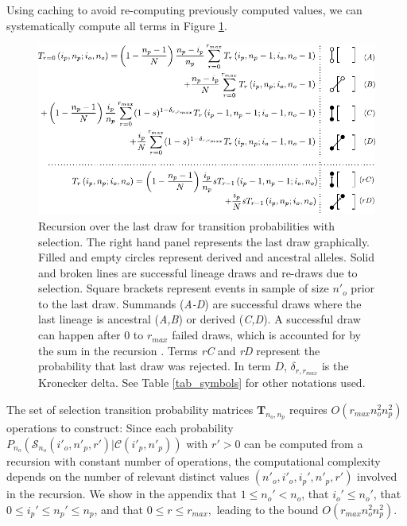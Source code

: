 \documentclass[9pt,twocolumn,twoside,lineno]{gsajnl}
\begin{document}
Using caching to avoid re-computing previously computed values, we can systematically compute all terms in Figure
\ref{fig_rec_selection_dynamic_fail}.
\begin{figure}
  \centering
  \includegraphics[width=\columnwidth]{fig/recurrence-selection-dynamic-failures-annotated_horizontal.pdf}

  \caption{Recursion over the last draw for transition probabilities with selection. 
    The right hand panel represents the last draw graphically.
    Filled and empty circles represent derived and ancestral alleles. 
    Solid and broken lines are
    successful lineage draws and re-draws due to selection.
    Square brackets represent events in sample of size $n'_o$ prior to the last draw. Summands
    (\textit{A-D}) are successful draws where the last lineage is ancestral (\textit{A,B}) or
    derived (\textit{C,D}). A successful draw can happen after
    $0$ to $r_{max}$ failed draws, which is accounted for by the sum in the recursion . Terms \textit{rC} and \textit{rD}
    represent the probability that last draw was rejected. In term $D$, $\delta_{r,r_{max}}$ is the Kronecker delta. See Table \ref{tab_symbols} for other notations used.
  }

  \label{fig_rec_selection_dynamic_fail}
\end{figure}
The set of selection transition probability matrices $\mathbf{T}_{n_o,n_p}$ requires $O(r_{max}n_o^2 n_p^2)$
operations to construct: Since each probability $P_{n_o}(\mathcal{S}_{n_o}(i'_o, n'_p, r')| \mathcal{C}(i'_p,n'_p) )$ with $r'>0$ can be computed from a recursion with
constant number of operations, the computational complexity depends on the number of relevant distinct values $(n'_o, i'_o,i_p', n'_p, r')$ involved in the recursion.   
We show in the appendix that $1 \leq n_o'<n_o$, that $i_o' \leq n_o'$, that $0\leq
i_p' \leq n_p' \leq n_p$, and that $0\leq r \leq r_{max},$ leading to the bound $O(r_{max}n_o^2 n_p^2).$
\end{document}
